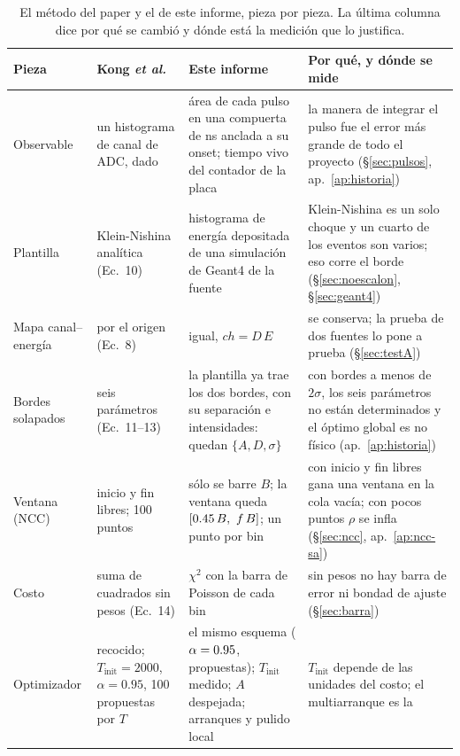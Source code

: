 \documentclass[11pt,a4paper]{article}
\begin{document}
\begin{table}[htbp]
\centering
\caption{El método del paper y el de este informe, pieza por pieza. La
última columna dice por qué se cambió y dónde está la medición que lo
justifica.}
\label{tab:adaptacion}
\footnotesize
\renewcommand{\arraystretch}{1.25}
\begin{tabular}{@{}>{\raggedright}p{1.9cm}>{\raggedright}p{3.6cm}>{\raggedright}p{4.4cm}>{\raggedright\arraybackslash}p{5.0cm}@{}}
\toprule
\textbf{Pieza} & \textbf{Kong \emph{et al.}} & \textbf{Este informe} &
\textbf{Por qué, y dónde se mide} \\
\midrule
Observable & un histograma de canal de ADC, dado &
  área de cada pulso en una compuerta de \PostFijo{} ns anclada a su onset;
  tiempo vivo del contador de la placa &
  la manera de integrar el pulso fue el error más grande de todo el proyecto
  (\S\ref{sec:pulsos}, ap.~\ref{ap:historia}) \\
Plantilla & Klein-Nishina analítica (Ec.~10) &
  histograma de energía depositada de una simulación de Geant4 de la fuente &
  Klein-Nishina es un solo choque y un cuarto de los eventos son varios; eso
  corre el borde (\S\ref{sec:noescalon}, \S\ref{sec:geant4}) \\
Mapa canal--energía & por el origen (Ec.~8) & igual, $ch = D\,E$ &
  se conserva; la prueba de dos fuentes lo pone a prueba
  (\S\ref{sec:testA}) \\
Bordes solapados & seis parámetros (Ec.~11--13) &
  la plantilla ya trae los dos bordes, con su separación e intensidades:
  quedan $\{A, D, \sigma\}$ &
  con bordes a menos de $2\sigma$, los seis parámetros no están determinados
  y el óptimo global es no físico (ap.~\ref{ap:historia}) \\
Ventana (NCC) & inicio y fin libres; 100 puntos &
  sólo se barre $B$; la ventana queda $[\InicioRel\,B,\ f\,B]$; un punto por
  bin &
  con inicio y fin libres gana una ventana en la cola vacía; con pocos puntos
  $\rho$ se infla (\S\ref{sec:ncc}, ap.~\ref{ap:ncc-sa}) \\
Costo & suma de cuadrados sin pesos (Ec.~14) &
  $\chi^2$ con la barra de Poisson de cada bin &
  sin pesos no hay barra de error ni bondad de ajuste (\S\ref{sec:barra}) \\
Optimizador & recocido; $T_{\text{init}} = 2000$, $\alpha = 0.95$, 100
  propuestas por $T$ &
  el mismo esquema ($\alpha = 0.95$, \NMarkov{} propuestas); $T_{\text{init}}$
  medido; $A$ despejada; \NArranques{} arranques y pulido local &
  $T_{\text{init}}$ depende de las unidades del costo; el multiarranque es la

\end{tabular}
\end{table}
\end{document}
